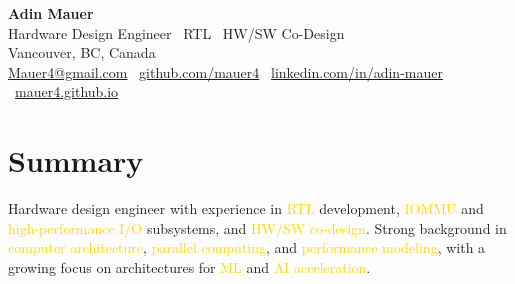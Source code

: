 \documentclass[11pt]{article}
\newcommand{\gold}[1]{\textcolor{gold}{#1}}
\begin{document}
\begin{center}
  {\LARGE \textbf{Adin Mauer}}\\
  Hardware Design Engineer \textbar\ RTL \textbar\ HW/SW Co-Design\\
  Vancouver, BC, Canada\\
  \href{mailto:Mauer4@gmail.com}{Mauer4@gmail.com} \textbar\ \href{https://github.com/mauer4}{github.com/mauer4} \textbar\ \href{https://www.linkedin.com/in/adin-mauer-4774821a1/}{linkedin.com/in/adin-mauer} \textbar\ \href{https://mauer4.github.io/}{mauer4.github.io}
\end{center}

\section{Summary}
Hardware design engineer with experience in \gold{RTL} development, \gold{IOMMU} and \gold{high-performance I/O} subsystems, and \gold{HW/SW co-design}. Strong background in \gold{computer architecture}, \gold{parallel computing}, and \gold{performance modeling}, with a growing focus on architectures for \gold{ML} and \gold{AI acceleration}.
\end{document}
